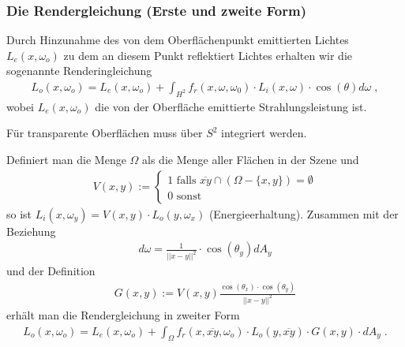  
\subsubsection{Die Rendergleichung (Erste und zweite Form)}

Durch Hinzunahme des von dem Oberflächenpunkt emittierten Lichtes $L_e(x, \omega_o)$ zu dem   an diesem Punkt reflektiert Lichtes erhalten wir die sogenannte Renderingleichung 
\begin{align}
L_o(x, \omega_o) = L_e(x, \omega_o)  + \displaystyle \int_{H^2}f_r (x, \omega, \omega_0) \cdot L_i(x, \omega)  \cdot  \cos(\theta) d\omega \; ,
\end{align}
wobei $L_e(x, \omega_o)$ die von der Oberfläche emittierte Strahlungsleistung ist. 

\begin{Bemerkung}
Für transparente Oberflächen muss über $S^2$ integriert werden.
\end{Bemerkung}
Definiert man die Menge $\Omega$  als die Menge aller Flächen  in der Szene und
\begin{align}
V(x,y) := \begin{cases}
1 \text{ falls } \overline{xy} \cap (\Omega -\{x,y\}) = \emptyset \\
0 \text{ sonst }
\end{cases}
\end{align}
so ist $L_i(x, \omega_y) = V(x,y) \cdot L_o(y, \omega_x)$ (Energieerhaltung).
Zusammen mit der Beziehung 
\begin{align}
d\omega =  \frac{1}{||x -y||^2} \cdot  \cos(\theta_y) dA_y
\end{align}
 und der Definition 
\begin{align}
G(x,y) := V(x,y)  \frac{ \cos(\theta_x) \cdot  \cos(\theta_y)}{||x -y||^2} 
\end{align}
erhält man die Rendergleichung in zweiter Form 
\begin{align}
L_o(x, \omega_o) = L_e(x, \omega_o)  + \displaystyle \int_{\Omega} f_r (x, \overline{xy}, \omega_o) \cdot   L_o(y, \overline{xy})  \cdot  G(x,y) \cdot   dA_y \; .
\end{align} 

